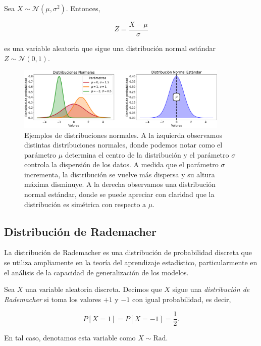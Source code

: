 \begin{proposicion}
    Sea $X \sim \mathcal{N}(\mu,\sigma^2)$. Entonces,
    
    \[ Z = \frac{X-\mu}{\sigma} \]

    es una variable aleatoria que sigue una distribución normal estándar $Z \sim\mathcal{N}(0,1)$.
\end{proposicion}

\begin{figure}[h]
    \centering
    \includegraphics[width=0.9\textwidth]{img/distribuciones-normales.png}
    \caption[Ejemplos de distribuciones normales.] {Ejemplos de distribuciones normales. A la izquierda observamos distintas distribuciones normales, donde podemos notar como el parámetro $\mu$ determina el centro de la distribución y el parámetro $\sigma$ controla la dispersión de los datos. A medida que el parámetro $\sigma$ incrementa, la distribución se vuelve más dispersa y su altura máxima disminuye. A la derecha observamos una distribución normal estándar, donde se puede apreciar con claridad que la distribución es simétrica con respecto a $\mu$.}\label{fig:distribuciones-normales}
\end{figure}

\subsection{Distribución de Rademacher}\label{subsec:distribucion-rademacher}
La distribución de Rademacher es una distribución de probabilidad discreta que se utiliza ampliamente en la teoría del aprendizaje estadístico, particularmente en el análisis de la capacidad de generalización de los modelos.

\begin{definicion}
    Sea $X$ una variable aleatoria discreta. Decimos que $X$ sigue una \emph{distribución de Rademacher} si toma los valores $+1$ y $-1$ con igual probabilidad, es decir,

    \[
        P[X = 1] = P[X = -1] = \frac{1}{2}.
    \]

    En tal caso, denotamos esta variable como $X \sim \text{Rad}$.
\end{definicion}

